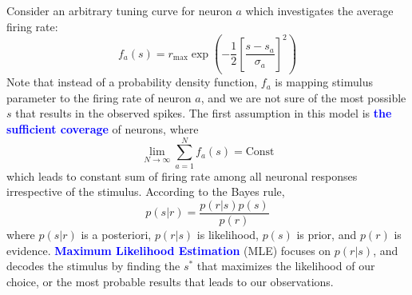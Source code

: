 \documentclass[11pt]{article}
\begin{document}
Consider an arbitrary tuning curve for neuron 
$a$ which investigates the average firing rate:
\begin{equation*}
    f_a(s)=r_{\text{max}}\exp(-\frac{1}{2}[\frac{s-s_a}{\sigma_a}]^2)
\end{equation*}
Note that instead of a probability density function, $f_a$ is mapping stimulus parameter to the firing rate of neuron $a$, and we are not sure of the most possible $s$ that results in the observed spikes. The first assumption in this model is \textcolor{Blue}{\textbf{the sufficient coverage}} of neurons, where
\begin{equation*}
    \lim_{N\to \infty} \sum_{a=1}^N f_a(s)=\text{Const}
\end{equation*}
which leads to constant sum of firing rate among all neuronal responses irrespective of the stimulus. According to the Bayes rule,
\begin{equation*}
    p(s|r)=\frac{p(r|s)p(s)}{p(r)}
\end{equation*}
where $p(s|r)$ is a posteriori, $p(r|s)$ is likelihood, $p(s)$ is prior, and $p(r)$ is evidence. \textcolor{Blue}{\textbf{Maximum Likelihood Estimation}} (MLE) focuses on $p(r|s)$, and decodes the stimulus by finding the $s^*$ that maximizes the likelihood of our choice, or the most probable results that leads to our observations. 
\\
\end{document}
